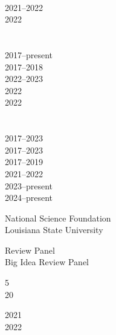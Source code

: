 \documentclass[10pt]{designcv}
\begin{document}
\begin{minipage}[t]{0.15\textwidth}
\ \\
2021--2022\\
2022\\
\ \\
\ \\
2017--present\\
2017--2018\\
2022--2023\\
2022\\
2022\\
\ \\
\ \\
2017--2023\\
2017--2023\\
2017--2019\\
2021--2022\\
2023--present\\
2024--present\\
\end{minipage}
\hfill



\begin{minipage}[t]{0.35\textwidth}
National Science Foundation\\
Louisiana State University\\
\end{minipage}
\hfill
\begin{minipage}[t]{0.3\textwidth}
Review Panel\\
Big Idea Review Panel\\
\end{minipage}
\hfill
\begin{minipage}[t]{0.1\textwidth}
5\\
20\\
\end{minipage}
\hfill
\begin{minipage}[t]{0.15\textwidth}
2021\\
2022\\
\end{minipage}

\end{document}
